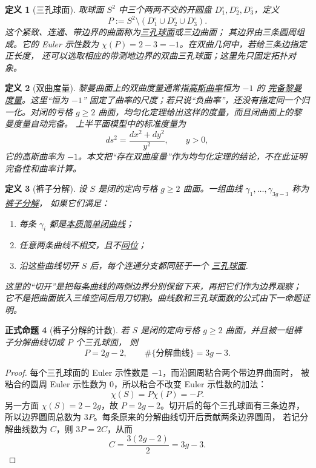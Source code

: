 \documentclass[UTF8,fontset=none,a4paper,11pt]{ctexart}
\theoremstyle{foundation-definition}
\newtheorem{definition}{定义}[section]
\theoremstyle{foundation-theorem}
\theoremstyle{foundation-proposition}
\newtheorem{proposition}[definition]{正式命题}
\theoremstyle{foundation-example}
\theoremstyle{foundation-remark}
\theoremstyle{foundation-theorem}
\newcommand{\term}[2]{\hyperref[#1]{#2}}
\begin{document}
\begin{definition}[三孔球面]\label{def:pair-of-pants}
取球面 \(S^2\) 中三个两两不交的开圆盘 \(D_1^\circ,D_2^\circ,D_3^\circ\)，定义
\[
P:=S^2\setminus(D_1^\circ\cup D_2^\circ\cup D_3^\circ).
\]
这个紧致、连通、带边界的曲面称为\term{def:pair-of-pants}{三孔球面}或三边曲面；
其边界由三条圆周组成。它的 Euler 示性数为
\(\chi(P)=2-3=-1\)。在双曲几何中，若给三条边指定正长度，
还可以选取相应的带测地边界的双曲三孔球面；这里先只固定拓扑对象。
\end{definition}

\begin{definition}[双曲度量]\label{def:hyperbolic-metric}
黎曼曲面上的双曲度量通常指\term{def:gaussian-curvature}{高斯曲率}恒为 \(-1\) 的
\term{def:riemannian-completeness}{完备黎曼度量}。这里“恒为 \(-1\)”
固定了曲率的尺度；若只说“负曲率”，还没有指定同一个归一化。对闭的亏格
\(g\geq2\) 曲面，均匀化定理给出这样的度量，而且闭曲面上的黎曼度量自动完备。
上半平面模型中的标准度量为
\[
ds^2=\frac{dx^2+dy^2}{y^2},\qquad y>0,
\]
它的高斯曲率为 \(-1\)。本文把“存在双曲度量”作为均匀化定理的结论，不在此证明
完备性和曲率计算。
\end{definition}

\begin{definition}[裤子分解]\label{def:pants-decomposition}
设 \(S\) 是闭的定向亏格 \(g\geq2\) 曲面。一组曲线
\(\gamma_1,\ldots,\gamma_{3g-3}\) 称为\term{def:pants-decomposition}{裤子分解}，
如果它们满足：
\begin{enumerate}[label=(\roman*)]
  \item 每条 \(\gamma_i\) 都是\term{def:essential-simple-closed-curve}{本质简单闭曲线}；
  \item 任意两条曲线不相交，且不\term{def:curve-isotopy}{同位}；
  \item 沿这些曲线切开 \(S\) 后，每个连通分支都同胚于一个
  \term{def:pair-of-pants}{三孔球面}.
\end{enumerate}
这里的“切开”是把每条曲线的两侧边界分别保留下来，再把它们作为边界观察；
它不是把曲面嵌入三维空间后用刀切割。曲线数和三孔球面数的公式由下一命题证明。
\end{definition}

\begin{proposition}[裤子分解的计数]\label{prop:pants-count}
若 \(S\) 是闭的定向亏格 \(g\geq2\) 曲面，并且被一组裤子分解曲线切成 \(P\) 个三孔球面，
则
\[
P=2g-2,\qquad \#\{\text{分解曲线}\}=3g-3.
\]
\end{proposition}

\begin{proof}
每个三孔球面的 Euler 示性数是 \(-1\)，而沿圆周粘合两个带边界曲面时，
被粘合的圆周 Euler 示性数为 \(0\)，所以粘合不改变 Euler 示性数的加法：
\[
\chi(S)=P\chi(P)= -P.
\]
另一方面 \(\chi(S)=2-2g\)，故 \(P=2g-2\)。切开后的每个三孔球面有三条边界，
所以边界圆周总数为 \(3P\)。每条原来的分解曲线切开后贡献两条边界圆周，
若记分解曲线数为 \(C\)，则 \(3P=2C\)，从而
\[
C=\frac{3(2g-2)}2=3g-3.
\]
\end{proof}
\end{document}
